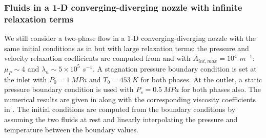 \documentclass[preprint,10pt]{elsarticle}
\begin{document}
\subsubsection{Fluids in a 1-D converging-diverging nozzle with infinite relaxation terms}\label{sec:nozzle-infinite-rel-coeff}
%
We still consider a two-phase flow in a $1$-D converging-diverging nozzle with the same initial conditions as in  but with large relaxation terms:  
the pressure and velocity relaxation coefficients are computed from  and  with $A_{int,max} =  
10^4$ $m^{-1}$: $\mu_P \sim 4$ and $\lambda_u \sim 5 \times 10^5$ $s^{-1}$. A stagnation pressure boundary condition is set at the inlet with $P_0 = 1 \ MPa$ and $T_0 = 453 \ K$ for both phases. At the outlet, a static pressure boundary condition is used with $P_s = 0.5 \ MPa$ for both phases also. The numerical results are given in  along with the corresponding viscosity coefficients in . The initial conditions are computed from the boundary conditions by assuming the two fluids at rest and linearly interpolating the pressure and temperature between the boundary values.
%
\end{document}
